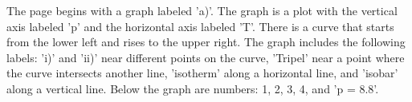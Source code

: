 The page begins with a graph labeled 'a)'. The graph is a plot with the vertical axis labeled 'p' and the horizontal axis labeled 'T'. There is a curve that starts from the lower left and rises to the upper right. The graph includes the following labels: 'i)' and 'ii)' near different points on the curve, 'Tripel' near a point where the curve intersects another line, 'isotherm' along a horizontal line, and 'isobar' along a vertical line. Below the graph are numbers: 1, 2, 3, 4, and 'p = 8.8'.